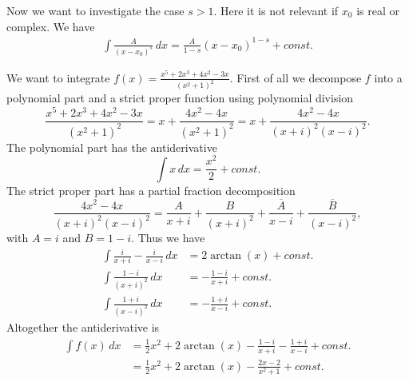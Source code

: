 Now we want to investigate the case $s>1$. Here it is not relevant if $x_{0}$ is real or complex. We have
\begin{align*}
\int \frac{A}{(x-x_{0})^{s}}\, dx = \frac{A}{1-s}(x-x_{0})^{1-s}+const.
\end{align*}
\begin{example}
We want to integrate $f(x)=\frac{x^{5}+2x^{3}+4x^{2}-3x}{(x^{2}+1)^{2}}$. First of all we decompose $f$ into a polynomial part and a strict proper function using polynomial division
$$
\frac{x^{5}+2x^{3}+4x^{2}-3x}{(x^{2}+1)^{2}} = x + \frac{4x^{2}-4x}{(x^{2}+1)^{2}} = x +  \frac{4x^{2}-4x}{(x+i)^{2}(x-i)^{2}}.
$$
The polynomial part has the antiderivative
$$
\int x\,dx = \frac{x^2}{2}+const.
$$
The strict proper part has a partial fraction decomposition
$$
\frac{4x^{2}-4x}{(x+i)^{2}(x-i)^{2}} = \frac{A}{x+i}+\frac{B}{(x+i)^{2}}+\frac{\overline{A}}{x-i}+\frac{\overline{B}}{(x-i)^{2}},
$$
with $A=i$ and $B=1-i$. Thus we have
\begin{align*}
\int \frac{i}{x+i} - \frac{i}{x-i}\, dx &= 2\arctan(x)+const.\\
\int \frac{1-i}{(x+i)^{2}}\,dx &= -\frac{1-i}{x+i}+const.\\
\int \frac{1+i}{(x-i)^{2}}\,dx &= -\frac{1+i}{x-i}+const.
\end{align*}
Altogether the antiderivative is
\begin{align*}
\int f(x)\, dx &= \frac12 x^2+2\arctan(x) -\frac{1-i}{x+i}-\frac{1+i}{x-i} + const.\\
&= \frac12 x^2+2\arctan(x)-\frac{2x-2}{x^{2}+1} + const.
\end{align*}
\end{example}

